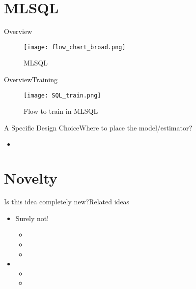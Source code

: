 \documentclass{beamer}
\begin{document}
\section{MLSQL}
\begin{frame}{Overview}{}
  \begin{figure}
      \centering
      \texttt{[image: flow\_chart\_broad.png]}
      \caption{MLSQL}
      \label{fig:flow_broad}
  \end{figure}
\end{frame}

\begin{frame}{Overview}{Training}
  \begin{figure}
      \centering
      \texttt{[image: SQL\_train.png]}
      \caption{Flow to train in MLSQL}
      \label{fig:flow_train}
  \end{figure}
\end{frame}

\begin{frame}{A Specific Design Choice}{Where to place the model/estimator?}
  \begin{itemize}
      \item 
  \end{itemize}
\end{frame}
\section{Novelty}
\begin{frame}{Is this idea completely new?}{Related ideas}
  \begin{itemize}
  \item<1-> {
   Surely not!
  }
      \begin{itemize}
          \item<2->
          \item<3-> 
          \item<4-> 
      \end{itemize}
      \item<5->{
      \begin{itemize}
          \item 
          \item 
      \end{itemize}
      }
  \end{itemize}
\end{frame}



\end{document}
